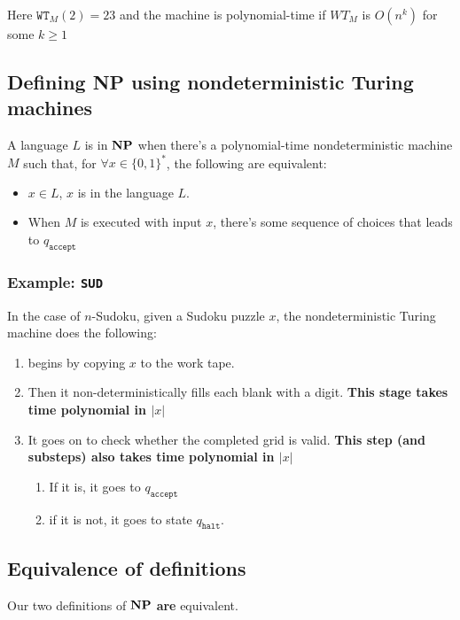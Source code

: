 \documentclass{article}
\begin{document}
Here $\texttt{WT}_{M}(2) = 23$ and the machine is polynomial-time if $WT_{M}$ is $O(n^{k})$ for some $k \geq 1$

\subsection{Defining \bf{NP} using nondeterministic Turing machines}
\label{subsec:NPNDTM}


A language $L$ is in $\bf{NP}$ when there's a polynomial-time nondeterministic machine $M$ such that, for $\forall x \in \{ 0,1 \} ^{*}$, the following are equivalent:

\begin{itemize}
  \item $x \in L$, $x$ is in the language $L$.
  \item When $M$ is executed with input $x$, there's some sequence of choices that leads to $q_{\texttt{accept} }$
\end{itemize}

\subsubsection{Example: \texttt{SUD} }

In the case of $n$-Sudoku, given a Sudoku puzzle $x$, the nondeterministic Turing machine does the following:

\begin{enumerate}
  \item begins by copying $x$ to the work tape.
  \item Then it non-deterministically fills each blank with a digit. \textbf{This stage takes time polynomial in $|x|$}
  \item It goes on to check whether the completed grid is valid. \textbf{This step (and substeps) also takes time polynomial in $|x|$}
        \begin{enumerate}
          \item If it is, it goes to $q_{\texttt{accept} }$
          \item if it is not, it goes to state $q_{\texttt{halt} }$.
        \end{enumerate}
\end{enumerate}

\subsection{Equivalence of definitions}

Our two definitions of $\bf{NP}$ \textbf{are} equivalent.
\end{document}
